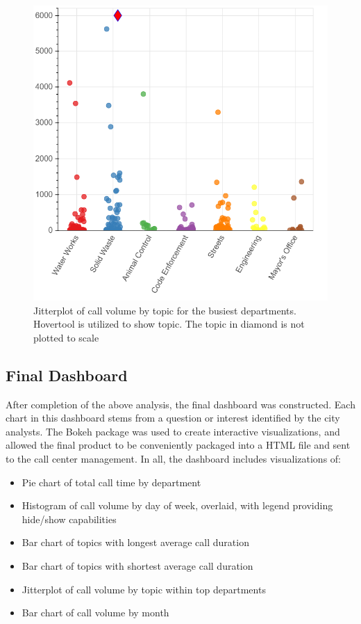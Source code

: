 \documentclass[11pt,twocolumn]{article}
\begin{document}
\begin{figure}[h]
  \includegraphics[scale=0.3]{jitterplot.png}
  \caption{Jitterplot of call volume by topic for the busiest departments.  Hovertool is utilized to show topic.  The topic in diamond is not plotted to scale}
\end{figure}

	\subsection{Final Dashboard}

After completion of the above analysis, the final dashboard was constructed.  Each chart in this dashboard stems from a question or interest identified by the city analysts.  The Bokeh package was used to create interactive visualizations, and allowed the final product to be conveniently packaged into a HTML file and sent to the call center management.  In all, the dashboard includes visualizations of:

\begin{itemize}
  \item{Pie chart of total call time by department}
  \item{Histogram of call volume by day of week, overlaid, with legend providing hide/show capabilities}
  \item{Bar chart of topics with longest average call duration}
  \item{Bar chart of topics with shortest average call duration}
  \item{Jitterplot of call volume by topic within top departments}
  \item{Bar chart of call volume by month}
\end{itemize}
\end{document}

